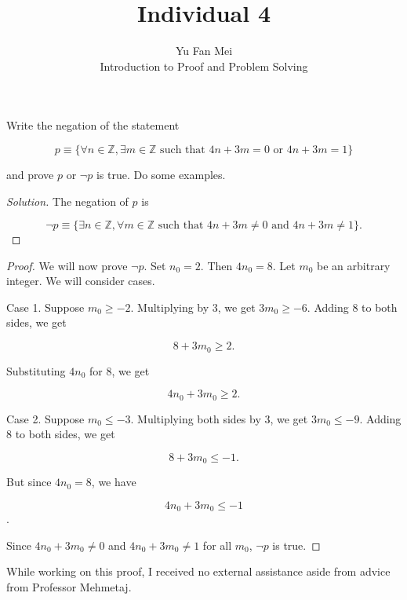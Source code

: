\documentclass[12pt]{article}
\newenvironment{problem}[2][Problem]{\begin{trivlist}
\item[\hskip \labelsep {\bfseries #1}\hskip \labelsep {\bfseries #2.}]}{\end{trivlist}}
\newenvironment{solution}
               {\let\oldqedsymbol=\qedsymbol
                \renewcommand{\qedsymbol}{$\blacktriangleleft$}
                \begin{proof}[\textit\upshape Solution]}
               {\end{proof}
                \renewcommand{\qedsymbol}{\oldqedsymbol}}
\begin{document}

\title{Individual 4}%
\author{Yu Fan Mei\\ %
	Introduction to Proof and Problem Solving} %

\maketitle

\begin{problem}{12} %
Write the negation of the statement

$$p \equiv \{ \forall n \in \mathbb{Z}, \exists m \in \mathbb{Z} \text{ such that } 4n + 3m = 0 \text{ or } 4n + 3m = 1 \} $$

and prove $p$ or $\lnot p$ is true. Do some examples.

\end{problem}

\begin{solution} The negation of $p$ is

	$$ \lnot p \equiv \{ \exists n \in \mathbb{Z}, \forall m \in \mathbb{Z} \text{ such that } 4n + 3m \neq 0 \text{ and } 4n + 3m \neq 1 \}. $$


\end{solution}


\begin{proof} We will now prove $\lnot p.$ Set $n_0 = 2.$ Then $4n_0 = 8.$ Let $m_0$ be an arbitrary integer. We will consider cases.

	\noindent Case 1. Suppose $m_0 \geq -2.$ Multiplying by 3, we get $3m_0 \geq -6.$ Adding 8 to both sides, we get

	$$8 + 3m_0 \geq 2.$$

	Substituting $4n_0$ for 8, we get

	$$4n_0 + 3m_0 \geq 2.$$


	\noindent Case 2. Suppose $m_0 \leq -3$. Multiplying both sides by 3, we get $3m_0 \leq -9$. Adding 8 to both sides, we get

	$$8 + 3m_0 \leq -1.$$

	But since $4n_0 = 8$, we have

	$$4n_0 + 3m_0 \leq -1$$.

	Since $4n_0 + 3m_0 \neq 0$ and $4n_0 + 3m_0 \neq 1$ for all $m_0$, $\lnot p$ is true.



\end{proof}


\noindent While working on this proof, I received no external assistance aside from advice from Professor Mehmetaj.
\end{document}
